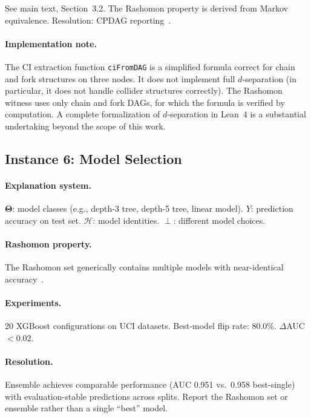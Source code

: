 \documentclass[11pt]{article}
\newcommand{\Params}{\mathbf{\Theta}}
\newcommand{\sH}{\mathcal{H}}
\newcommand{\incomp}{\perp}
\begin{document}
See main text, Section~3.2. The Rashomon property is derived from Markov
equivalence. Resolution: CPDAG
reporting~\cite{chickering2002optimal}.

\paragraph{Implementation note.}
The CI extraction function \texttt{ciFromDAG} is a simplified formula
correct for chain and fork structures on three nodes. It does not
implement full $d$-separation (in particular, it does not handle
collider structures correctly). The Rashomon witness uses only chain and
fork DAGs, for which the formula is verified by computation. A complete
formalization of $d$-separation in Lean~4 is a substantial undertaking
beyond the scope of this work.

\subsection{Instance 6: Model Selection}

\paragraph{Explanation system.}
$\Params$: model classes (e.g., depth-3 tree, depth-5 tree, linear model).
$Y$: prediction accuracy on test set.
$\sH$: model identities.
$\incomp$: different model choices.

\paragraph{Rashomon property.}
The Rashomon set generically contains multiple models with near-identical
accuracy~\cite{rudin2024amazing, semenova2022existence}.

\paragraph{Experiments.}
20 XGBoost configurations on UCI datasets. Best-model flip rate: 80.0\%.
$\Delta$AUC $< 0.02$.

\paragraph{Resolution.}
Ensemble achieves comparable performance (AUC 0.951 vs.\ 0.958
best-single) with evaluation-stable predictions across splits. Report
the Rashomon set or ensemble rather than a single ``best'' model.
\end{document}
